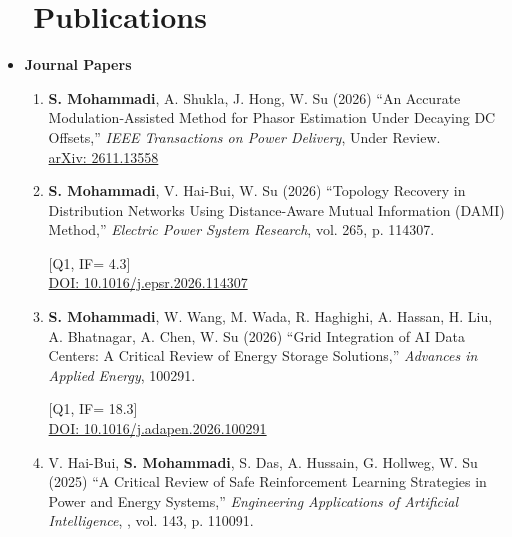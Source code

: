 \documentclass[a4paper,8pt]{article}
\begin{document}
\section{~~Publications}
\begin{itemize}
    \item
    \textbf{Journal Papers}
    \begin{enumerate}
    \item
	    \textbf{S. Mohammadi}, A. Shukla, J. Hong, W. Su (2026) “An Accurate Modulation-Assisted Method for Phasor Estimation Under Decaying DC Offsets,” \textit{IEEE Transactions on Power Delivery}, Under Review.\\
        \href{https://arxiv.org/abs/2611.13558}{arXiv: 2611.13558}

        
    \item
	    \textbf{S. Mohammadi}, V. Hai-Bui, W. Su (2026) “Topology Recovery in Distribution Networks Using Distance-Aware Mutual Information (DAMI) Method,” \textit{Electric Power System Research}, vol. 265, p. 114307.

        [Q1, IF= 4.3]\\
        \href{https://doi.org/10.1016/j.epsr.2026.114307}{DOI: 10.1016/j.epsr.2026.114307}

    \item
	    \textbf{S. Mohammadi}, W. Wang, M. Wada, R. Haghighi, A. Hassan, H. Liu, A. Bhatnagar, A. Chen, W. Su (2026) “Grid Integration of AI Data Centers: A Critical Review of Energy Storage Solutions,” \textit{Advances in Applied Energy}, 100291.
        
        [Q1, IF= 18.3]\\
        \href{https://doi.org/10.1016/j.adapen.2026.100291}{DOI: 10.1016/j.adapen.2026.100291}

    \item
	    V. Hai-Bui, \textbf{S. Mohammadi}, S. Das, A. Hussain, G. Hollweg, W. Su (2025) “A Critical Review of Safe Reinforcement Learning Strategies in Power and Energy Systems,” \textit{Engineering Applications of Artificial Intelligence}, , vol. 143, p. 110091.


\end{enumerate}
\end{itemize}
\end{document}
